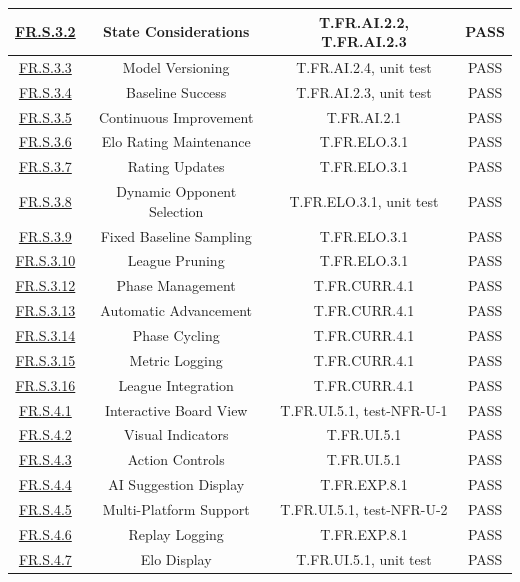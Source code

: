 \documentclass[12pt, titlepage]{article}
\begin{document}
\begin{table}[H]
{\begin{tabular}{|c|c|c|c|}
\hyperref[FR.S.3.2]{FR.S.3.2} & State Considerations & T.FR.AI.2.2, T.FR.AI.2.3 & PASS \\ \hline
\hyperref[FR.S.3.3]{FR.S.3.3} & Model Versioning & T.FR.AI.2.4, unit test & PASS \\ \hline
\hyperref[FR.S.3.4]{FR.S.3.4} & Baseline Success & T.FR.AI.2.3, unit test & PASS \\ \hline
\hyperref[FR.S.3.5]{FR.S.3.5} & Continuous Improvement & T.FR.AI.2.1 & PASS \\ \hline
\hyperref[FR.S.3.6]{FR.S.3.6} & Elo Rating Maintenance & T.FR.ELO.3.1 & PASS \\ \hline
\hyperref[FR.S.3.7]{FR.S.3.7} & Rating Updates & T.FR.ELO.3.1 & PASS \\ \hline
\hyperref[FR.S.3.8]{FR.S.3.8} & Dynamic Opponent Selection & T.FR.ELO.3.1, unit test & PASS \\ \hline
\hyperref[FR.S.3.9]{FR.S.3.9} & Fixed Baseline Sampling & T.FR.ELO.3.1 & PASS \\ \hline
\hyperref[FR.S.3.10]{FR.S.3.10} & League Pruning & T.FR.ELO.3.1 & PASS \\ \hline
\hyperref[FR.S.3.12]{FR.S.3.12} & Phase Management & T.FR.CURR.4.1 & PASS \\ \hline
\hyperref[FR.S.3.13]{FR.S.3.13} & Automatic Advancement & T.FR.CURR.4.1 & PASS \\ \hline
\hyperref[FR.S.3.14]{FR.S.3.14} & Phase Cycling & T.FR.CURR.4.1 & PASS \\ \hline
\hyperref[FR.S.3.15]{FR.S.3.15} & Metric Logging & T.FR.CURR.4.1 & PASS \\ \hline
\hyperref[FR.S.3.16]{FR.S.3.16} & League Integration & T.FR.CURR.4.1 & PASS \\ \hline
\hyperref[FR.S.4.1]{FR.S.4.1} & Interactive Board View & T.FR.UI.5.1, test-NFR-U-1 & PASS \\ \hline
\hyperref[FR.S.4.2]{FR.S.4.2} & Visual Indicators & T.FR.UI.5.1 & PASS \\ \hline
\hyperref[FR.S.4.3]{FR.S.4.3} & Action Controls & T.FR.UI.5.1 & PASS \\ \hline
\hyperref[FR.S.4.4]{FR.S.4.4} & AI Suggestion Display & T.FR.EXP.8.1 & PASS \\ \hline
\hyperref[FR.S.4.5]{FR.S.4.5} & Multi-Platform Support & T.FR.UI.5.1, test-NFR-U-2 & PASS \\ \hline
\hyperref[FR.S.4.6]{FR.S.4.6} & Replay Logging & T.FR.EXP.8.1 & PASS \\ \hline
\hyperref[FR.S.4.7]{FR.S.4.7} & Elo Display & T.FR.UI.5.1, unit test & PASS \\ \hline

\end{tabular}}
\end{table}
\end{document}
